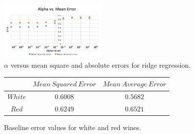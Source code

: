\begin{figure}[htb]



  \centering  %

  \includegraphics[width=0.47\textwidth]{figs/errorridge.png}

  \caption{ $\alpha$ versus mean square and absolute errors for ridge regression.}

  \label{fig:errorridge}

\end{figure}

\begin{figure}[htb]
  \centering %

  \begin{tabular}{|c|c|c|} 
    \hline \hline %
    $~$ & $Mean~Squared~Error$ & $Mean~Average~Error$\\ %
    \hline %
    $White$ & $0.6008$ & $0.5682$\\
    $Red$ & $0.6249$ & $0.6521$\\
    \hline \hline
  \end{tabular}

  \caption{Baseline error values for white and red wines.}
  \label{tab:baseline}
\end{figure}

